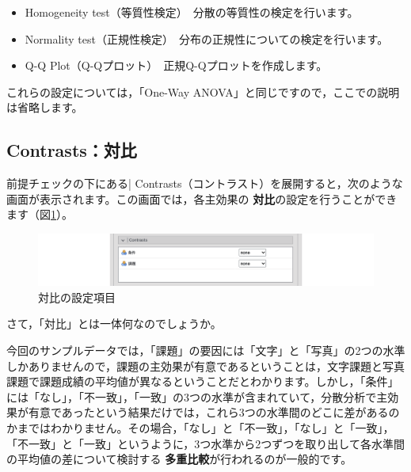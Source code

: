 \documentclass[
  12pt,
  a5jpaper,
  lualatex, ja=standard]{bxjsbook}
\providecommand{\tightlist}{%
  \setlength{\itemsep}{0pt}\setlength{\parskip}{0pt}}
\renewcommand{\emph}[1]{\textbf{\color{emph} #1}}
\newenvironment{jmvsettings}{%
	\begin{center}%
	\begin{tcolorbox}[%
		title=設定項目,
		colframe=gmoji,
		colbacktitle=gmoji,
		colback=gmoji!2!white,
		breakable,
		width=.9\textwidth,
		]\small\addtolength{\leftmargini}{-3\labelsep}%
	}%
	{\end{tcolorbox}\end{center}}
\begin{document}
\begin{jmvsettings}

\begin{itemize}
\tightlist
\item
  Homogeneity test（等質性検定）　分散の等質性の検定を行います。
\item
  Normality test（正規性検定）　分布の正規性についての検定を行います。
\item
  Q-Q Plot（Q-Qプロット）　正規Q-Qプロットを作成します。
\end{itemize}

\end{jmvsettings}

これらの設定については，「One-Way ANOVA」と同じですので，ここでの説明は省略します。

\hypertarget{sub:ANOVA-anova-contrasts}{%
\subsection{Contrasts：対比}\label{sub:ANOVA-anova-contrasts}}

前提チェックの下にある\colorbox{bar}{\textcolor{gmoji2}{| Contrasts}}（コントラスト）を展開すると，次のような画面が表示されます。この画面では，各主効果の\emph{対比}の設定を行うことができます（図\ref{fig:ANOVA-anova-contrasts}）。

\begin{figure}[!ht]

{\centering \includegraphics[width=1\linewidth]{images/ANOVA/anova-contrasts} 

}

\caption{対比の設定項目}\label{fig:ANOVA-anova-contrasts}
\end{figure}

さて，「対比」とは一体何なのでしょうか。

今回のサンプルデータでは，「課題」の要因には「文字」と「写真」の2つの水準しかありませんので，課題の主効果が有意であるということは，文字課題と写真課題で課題成績の平均値が異なるということだとわかります。しかし，「条件」には「なし」，「不一致」，「一致」の3つの水準が含まれていて，分散分析で主効果が有意であったという結果だけでは，これら3つの水準間のどこに差があるのかまではわかりません。その場合，「なし」と「不一致」，「なし」と「一致」，「不一致」と「一致」というように，3つ水準から2つずつを取り出して各水準間の平均値の差について検討する\emph{多重比較}が行われるのが一般的です。
\end{document}
